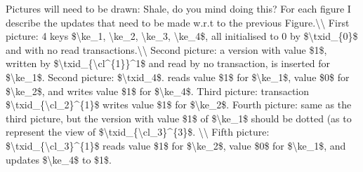 \ac{Pictures will need to be drawn: Shale, do you mind doing this? 
For each figure I describe the updates that need to be made w.r.t to the previous 
Figure.\\
First picture: 4 keys $\ke_1, \ke_2, \ke_3, \ke_4$, 
all initialised to 0 by $\txid_{0}$ and with no read transactions.\\
Second picture: a version with value $1$, written by $\txid_{\cl^{1}}^1$ 
and read by no transaction, is inserted for $\ke_1$. Second picture: $\txid_4$.
reads value $1$ for $\ke_1$, value $0$ for $\ke_2$, and writes value $1$ for $\ke_4$. 
Third picture: transaction $\txid_{\cl_2}^{1}$ writes value $1$ for $\ke_2$. 
Fourth picture: same as the third picture, but the version with value $1$ of $\ke_1$ 
should be dotted (as to represent the view of $\txid_{\cl_3}^{3}$. \\
Fifth picture: $\txid_{\cl_3}^{1}$ reads value $1$ for $\ke_2$, value $0$ for $\ke_1$, 
and updates $\ke_4$ to $1$.}
%
%
